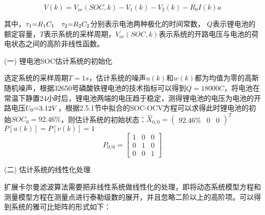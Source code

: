 \begin{equation}
V\left( k \right) = {V_{oc}}\left( {SOC,k} \right) - {V_1}\left( k \right) - {V_2}\left( k \right) - {R_0}I\left( k \right)a
\end{equation} 

其中，${\tau _1}{\rm{ = }}{R_1}{C_1}$~ ${\tau _2}{\rm{ = }}{R_2}{C_2}$分别表示电池两种极化的时间常数， $Q$表示锂电池的额定容量，$T$表示系统的采样周期，${V_{oc}}\left( {SOC,k} \right)$表示系统的开路电压与电池的荷电状态之间的高阶非线性函数。

(一)	锂电池SOC估计系统的初始化

选定系统的采样周期$T = 1s$，估计系统的噪声$u\left( k \right)$和$w\left( k \right)$都为均值为零的高斯随机噪声，根据32650号磷酸铁锂电池的技术指标可以得到$Q = 18000C$，将电池在常温下静置24小时后，锂电池两端的电压趋于稳定，测得锂电池的电压为电池的开路电压${U_0}{\rm{ = }}3.12V$，根据2.5.1节中拟合的SOC-OCV方程可以求得此时锂电池的初始$SO{C_0} = 92.46\% $，则估计系统的初始状态：${\widehat X_{0/0}} = {\left( {\begin{array}{*{20}{c}}
{92.46\% }&0&0
\end{array}} \right)^T}$~$P\left[ {u\left( k \right)} \right] = P\left[ {v\left( k \right)} \right] = 1$
\[{P_{0/0}} = \left[ {\begin{array}{*{20}{c}}
1&0&0\\
0&1&0\\
0&0&1
\end{array}} \right]\]

(二)	估计系统的线性化处理

	扩展卡尔曼滤波算法需要把非线性系统做线性化的处理，即将动态系统模型方程和测量模型方程在测量点进行泰勒级数的展开，并且忽略二阶以上的高阶项。可以得到系统的雅可比矩阵的形式如下：

